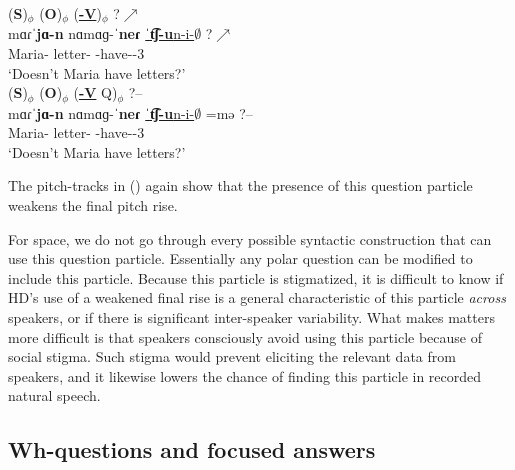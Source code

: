 \begin{exe}
	\ex \begin{xlist}
		\ex \glll (\textbf{S})$_\phi$ (\textbf{O})$_\phi$ (\underline{\textbf{{\neggloss}-V}})$_\phi$  ?$\nearrow$ \\
		mɑɾˈ\textbf{jɑ-n} nɑmɑɡ-ˈ\textbf{neɾ} \underline{ˈ\textbf{t͡ʃ-u}n-i-$\emptyset$} ?$\nearrow$ \\
		Maria-{} letter-{\pl} {\neggloss}-have-{\thgloss}-3{\sg} \\
		\trans `Doesn't Maria have letters?'
		\label{example:intonation:focus:polar:particile:me:neg:no}
		\\ 
		\ex \glll (\textbf{S})$_\phi$ (\textbf{O})$_\phi$ (\underline{\textbf{{\neggloss}-V}} Q)$_\phi$  ?-- \\
		mɑɾˈ\textbf{jɑ-n} nɑmɑɡ-ˈ\textbf{neɾ} \underline{ˈ\textbf{t͡ʃ-u}n-i-$\emptyset$}  =mə ?--\\
		Maria-{} letter-{\pl} {\neggloss}-have-{\thgloss}-3{\sg} {\q} \\
		\trans `Doesn't Maria have letters?'
		\label{example:intonation:focus:polar:particile:me:neg:yes}
		\\ 
	\end{xlist}
\end{exe}

The pitch-tracks in () again show that the presence of this question particle weakens the final pitch rise. 

For space, we do not go through every possible syntactic construction that can use this question particle. Essentially any polar question can be modified to include this particle. Because this particle is stigmatized, it is difficult to know if HD's use of a weakened final rise is a general characteristic of this particle \textit{across} speakers, or if there is significant inter-speaker variability. What makes matters more difficult is that speakers consciously avoid using this particle because of social stigma. Such stigma would prevent eliciting the relevant data from speakers, and it likewise lowers the chance of finding this particle in recorded natural speech. 




\subsection{Wh-questions  and focused answers}\label{section:intonation:focus:wh}

